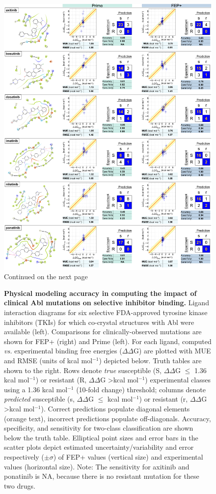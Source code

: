 \documentclass[phd,tocprelim]{cornell}
\begin{document}
\begin{landscape}
	\begin{figure}[p]
		\centering
		\includegraphics[width=0.5\linewidth]{figures/abl-figure-4.pdf}
		\caption[Physical modeling accuracy in computing the impact of clinical Abl mutations on selective inhibitor binding.]{
			Continued on the next page
			}
		\label{fig:abl-figure4}
	\end{figure}
\end{landscape}
\addtocounter{figure}{-1}
\begin{landscape}
	\begin{figure}
		\caption[Figure caption]{{\bf Physical modeling accuracy in computing the impact of clinical Abl mutations on selective inhibitor binding.}
			Ligand interaction diagrams for six selective FDA-approved tyrosine kinase inhibitors (TKIs) for which co-crystal structures with Abl were available (left). Comparisons for clinically-observed mutations are shown for FEP+ (right) and Prime (left).
			For each ligand, computed \emph{vs.} experimental binding free energies ($\Delta \Delta$G) are plotted with MUE and RMSE (units of kcal mol$^{-1}$) depicted below.
			Truth tables are shown to the right.
			Rows denote \emph{true} susceptible (S, $\Delta \Delta$G $\leq$ 1.36 kcal mol$^{-1}$) or resistant (R, $\Delta \Delta$G \textgreater kcal mol$^{-1}$) experimental classes using a 1.36 kcal mol$^{-1}$ (10-fold change) threshold;
			columns denote \emph{predicted} susceptible (s, $\Delta \Delta$G $\leq$ kcal mol$^{-1}$) or resistant (r, $\Delta \Delta$G \textgreater kcal mol$^{-1}$).
			Correct predictions populate diagonal elements (orange text), incorrect predictions populate off-diagonals.
			Accuracy, specificity, and sensitivity for two-class classification are shown below the truth table.
			Elliptical point sizes and error bars in the scatter plots depict estimated uncertainty/variability and error respectively ($\pm\sigma$) of FEP+ values (vertical size) and experimental values (horizontal size).
			Note: The sensitivity for axitinib and ponatinib is NA, because there is no resistant mutation for these two drugs.
		}
	\end{figure}
\end{landscape}
\end{document}
